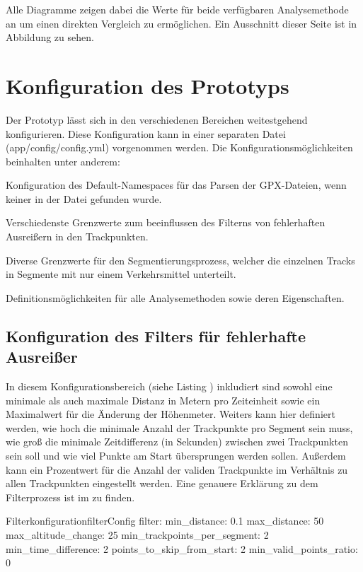 Alle Diagramme zeigen dabei die Werte für beide verfügbaren Analysemethode an um einen direkten Vergleich zu ermöglichen. Ein Ausschnitt dieser Seite ist in Abbildung  zu sehen.


\section{Konfiguration des Prototyps}
Der Prototyp lässt sich in den verschiedenen Bereichen weitestgehend konfigurieren. Diese Konfiguration kann in einer separaten Datei (app/config/config.yml) vorgenommen werden. Die Konfigurationsmöglichkeiten beinhalten unter anderem:
\begin{pitemize}
\item Konfiguration des Default-Namespaces für das Parsen der GPX-Dateien, wenn keiner in der Datei gefunden wurde.
\item Verschiedenste Grenzwerte zum beeinflussen des Filterns von fehlerhaften Ausreißern in den Trackpunkten.
\item Diverse Grenzwerte für den Segmentierungsprozess, welcher die einzelnen Tracks in Segmente mit nur einem Verkehrsmittel unterteilt.
\item Definitionsmöglichkeiten für alle Analysemethoden sowie deren Eigenschaften.
\end{pitemize}

\subsection{Konfiguration des Filters für fehlerhafte Ausreißer}
In diesem Konfigurationsbereich (siehe Listing ) inkludiert sind sowohl eine minimale als auch maximale Distanz in Metern pro Zeiteinheit sowie ein Maximalwert für die Änderung der Höhenmeter. Weiters kann hier definiert werden, wie hoch die minimale Anzahl der Trackpunkte pro Segment sein muss, wie groß die minimale Zeitdifferenz (in Sekunden) zwischen zwei Trackpunkten sein soll und wie viel Punkte am Start übersprungen werden sollen. Außerdem kann ein Prozentwert für die Anzahl der validen Trackpunkte im Verhältnis zu allen Trackpunkten eingestellt werden. Eine genauere Erklärung zu dem Filterprozess ist im  zu finden.

\begin{code}[]{Filterkonfiguration}{filterConfig}
  filter:
    min_distance: 0.1
    max_distance: 50
    max_altitude_change: 25
    min_trackpoints_per_segment: 2
    min_time_difference: 2
    points_to_skip_from_start: 2
    min_valid_points_ratio: 0
\end{code}

